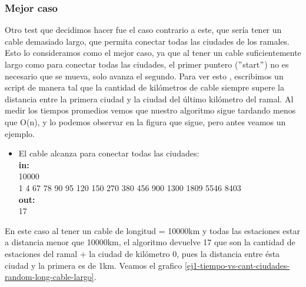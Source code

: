 \subsubsection{Mejor caso}

Otro test que decidimos hacer fue el caso contrario a este, que sería tener un cable demasiado largo, que permita conectar todas las ciudades de los ramales. Esto lo consideramos como el mejor caso, ya que al tener un cable suficientemente largo como para conectar todas las ciudades, el primer puntero ($"$start$"$) no es necesario que se mueva, solo avanza el segundo. Para ver esto , escribimos un script de manera tal que la cantidad de kilómetros de cable siempre supere la distancia entre la primera ciudad y la ciudad del último kilómetro del ramal. Al medir los tiempos promedios vemos que nuestro algoritmo sigue tardando menos que O(n), y lo podemos observar en la figura que sigue, pero antes veamos un ejemplo. \\

\begin{itemize}
\item El cable alcanza para conectar todas las ciudades:\\
\textbf{in:}\\
10000\\
1 4 67 78 90 95 120 150 270 380 456 900 1300 1809 5546 8403\\
\textbf{out:}\\
17\\
\end{itemize}
En este caso al tener un cable de longitud = 10000km y todas las estaciones estar a distancia menor que 10000km, el algoritmo devuelve 17 que son la cantidad de estaciones del ramal + la ciudad de kilómetro 0, pues la distancia entre ésta ciudad y la primera es de 1km. Veamos el grafico \ref{ej1-tiempo-vs-cant-ciudades-random-long-cable-largo}. \\

